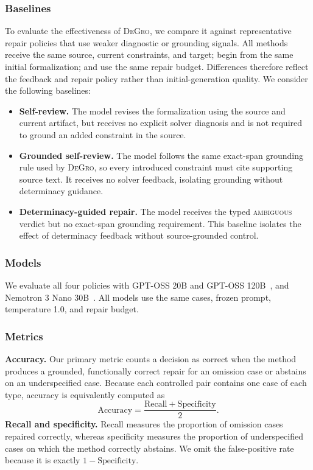 \documentclass[sigconf,anonymous]{aamas}
\newcommand{\method}{\textsc{DeGro}}
\begin{document}
\subsubsection{Baselines}
To evaluate the effectiveness of \method{}, we compare it against representative repair policies that use weaker diagnostic or grounding signals. All methods receive the same source, current constraints, and target; begin from the same initial formalization; and use the same repair budget. Differences therefore reflect the feedback and repair policy rather than initial-generation quality. We consider the following baselines:
\begin{itemize}
    \item \textbf{Self-review.} The model revises the formalization using the source and current artifact, but receives no explicit solver diagnosis and is not required to ground an added constraint in the source.
    \item \textbf{Grounded self-review.} The model follows the same exact-span grounding rule used by \method{}, so every introduced constraint must cite supporting source text. It receives no solver feedback, isolating grounding without determinacy guidance.
    \item \textbf{Determinacy-guided repair.} The model receives the typed \textsc{ambiguous} verdict but no exact-span grounding requirement. This baseline isolates the effect of determinacy feedback without source-grounded control.
\end{itemize}

\subsubsection{Models}
We evaluate all four policies with GPT-OSS 20B and GPT-OSS 120B~\cite{openai2025gptoss}, and Nemotron 3 Nano 30B~\cite{nvidia2025nemotronnano}. All models use the same cases, frozen prompt, temperature 1.0, and repair budget.

\subsubsection{Metrics}
\noindent\textbf{Accuracy.} Our primary metric counts a decision as correct when the method produces a grounded, functionally correct repair for an omission case or abstains on an underspecified case. Because each controlled pair contains one case of each type, accuracy is equivalently computed as
\[
\mathrm{Accuracy}=\frac{\mathrm{Recall}+\mathrm{Specificity}}{2}.
\]
\noindent\textbf{Recall and specificity.} Recall measures the proportion of omission cases repaired correctly, whereas specificity measures the proportion of underspecified cases on which the method correctly abstains. We omit the false-positive rate because it is exactly $1-\mathrm{Specificity}$.
\end{document}
